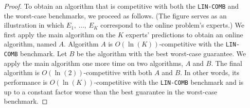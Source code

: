 \begin{proof}
	To obtain an algorithm that is competitive with both the \texttt{LIN-COMB} and the worst-case benchmarks,
	we proceed as follows. (The figure %
	serves as an illustration in which  $E_1,\ \dots,\ E_K$ correspond to the online problem's experts.)
	We first apply the main algorithm on the $K$ experts' predictions to obtain an online algorithm, named $A$.
	Algorithm $A$ is $O(\ln (K))$-competitive with the \texttt{LIN-COMB} benchmark. Let $B$ be the algorithm with the best worst-case guarantee.
	We apply the main algorithm one more time on two algorithms, $A$ and $B$. The final algorithm is $O(\ln (2))$-competitive with both $A$ and $B$.
	In other words, its performance is $O(\ln (K))$-competitive with the \texttt{LIN-COMB} benchmark and is up to a constant factor worse than the best guarantee in the worst-case benchmark.
\end{proof}

